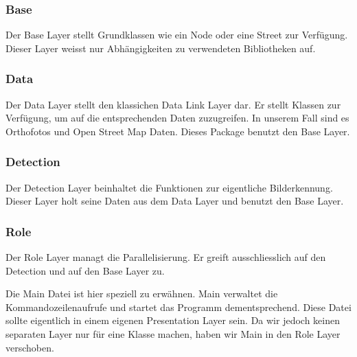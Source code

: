 \subsubsection{Base}
Der Base Layer stellt Grundklassen wie ein Node oder eine Street zur Verfügung. Dieser Layer weisst nur Abhängigkeiten zu verwendeten Bibliotheken auf.

\subsubsection{Data}
Der Data Layer stellt den klassichen Data Link Layer dar. Er stellt Klassen zur Verfügung, um auf die entsprechenden Daten zuzugreifen. In unserem Fall sind es Orthofotos und Open Street Map Daten. Dieses Package benutzt den Base Layer.

\subsubsection{Detection}
Der Detection Layer beinhaltet die Funktionen zur eigentliche Bilderkennung. Dieser Layer holt seine Daten aus dem Data Layer und benutzt den Base Layer.

\subsubsection{Role}
Der Role Layer managt die Parallelisierung. Er greift ausschliesslich auf den Detection und auf den Base Layer zu.

Die Main Datei ist hier speziell zu erwähnen. Main verwaltet die Kommandozeilenaufrufe und startet das Programm dementsprechend. Diese Datei sollte eigentlich in einem eigenen Presentation Layer sein. Da wir jedoch keinen separaten Layer nur für eine Klasse machen, haben wir Main in den Role Layer verschoben.
